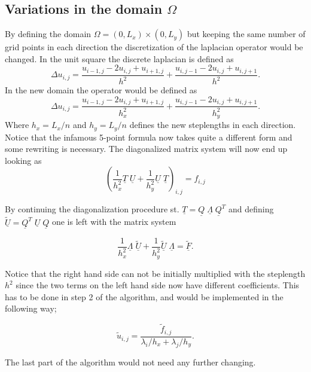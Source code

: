 \documentclass[norsk]{article} %
\numberwithin{equation}{section} %
\numberwithin{figure}{section} %
\numberwithin{table}{section} %
\begin{document}
\subsection{Variations in the domain $\Omega$}
By defining the domain $\Omega = (0,L_x)\times(0,L_y)$ but keeping the same number of grid points in each direction 
the discretization of the laplacian operator would be changed. In the unit square the discrete laplacian is defined as 
\begin{equation}
	\Delta u_{i,j} = \frac{u_{i-1,j}-2u_{i,j}+u_{i+1,j}}{h^2}+\frac{u_{i,j-1}-2u_{i,j}+u_{i,j+1}}{h^2}.
\end{equation}
In the new domain the operator would be defined as  
\begin{equation}
	\Delta u_{i,j} = \frac{u_{i-1,j}-2u_{i,j}+u_{i+1,j}}{h_x^2}+\frac{u_{i,j-1}-2u_{i,j}+u_{i,j+1}}{h_y^2}.
\end{equation}
Where $h_x=L_x/n$ and $h_y=L_y/n$ defines the new steplengths in each direction. Notice that the infamous 5-point formula now takes quite a 
different form and some rewriting is necessary. 
The diagonalized matrix system will now end up looking as 
\begin{equation}
	\left( \frac{1}{h_x^2}\underline{T} \; \underline{U}+\frac{1}{h_y^2}\underline{U}\; \underline{T} \right) _{i,j}=f_{i,j}
\end{equation}

By continuing the diagonalization procedure st. $\underline{T}=\underline{Q}\;\underline{\Lambda}\;\underline{Q}^T $
and defining $\underline{\tilde{U}}= \underline{Q}^T\;\underline{U}\;\underline{Q}$ one is left with the matrix system 

\begin{equation}
	\frac{1}{h_x^2}\underline{\Lambda} \; \underline{\tilde{U}}+\frac{1}{h_y^2}\underline{\tilde{U}}\; \underline{\Lambda} =\underline{\tilde{F}}.
\end{equation}

Notice that the right hand side can not be initially multiplied with the steplength $h^2$ since the two terms on the left hand side
now have different coefficients. This has to be done in step 2 of the algorithm, and would be implemented in the following way; 

\begin{equation}
	\tilde{u}_{i,j} = \frac{\tilde{f}_{i,j}}{\lambda_i/h_x+\lambda_j/h_y}.
\end{equation}

The last part of the algorithm would not need any further changing.
\end{document}
